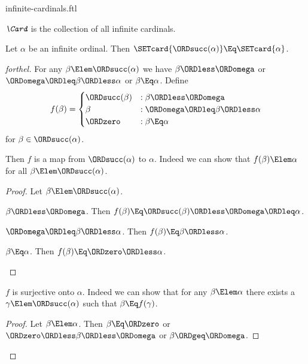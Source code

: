 \documentclass{stex}
\begin{document}
\begin{smodule}{infinite-cardinals.ftl}

\begin{definition}[forthel]
  $\emph{\Card}$ is the collection of all infinite cardinals.
\end{definition}

\begin{proposition}[forthel]
  Let $\alpha$ be an infinite ordinal.
  Then $\SETcard{\ORDsucc(\alpha)} \Eq \SETcard{\alpha}$.
\end{proposition}
\begin{proof}[forthel]
  For any $\beta \Elem \ORDsucc(\alpha)$ we have
  $\beta \ORDless \ORDomega$ or $\ORDomega \ORDleq \beta \ORDless \alpha$ or $\beta \Eq \alpha$.
  Define \[ f(\beta) =
    \begin{cases}
      \ORDsucc(\beta)  & : \beta \ORDless \ORDomega
      \\
      \beta         & : \ORDomega \ORDleq \beta \ORDless \alpha
      \\
      \ORDzero             & : \beta \Eq \alpha
    \end{cases} \]
  for $\beta \in \ORDsucc(\alpha)$.

  Then $f$ is a map from $\ORDsucc(\alpha)$ to $\alpha$.
  Indeed we can show that $f(\beta) \Elem \alpha$ for all
  $\beta \Elem \ORDsucc(\alpha)$.
  \begin{proof}
    Let $\beta \Elem \ORDsucc(\alpha)$.

    \begin{case}{$\beta \ORDless \ORDomega$.}
      Then $f(\beta)
        \Eq \ORDsucc(\beta)
        \ORDless \ORDomega
        \ORDleq \alpha$.
    \end{case}

    \begin{case}{$\ORDomega \ORDleq \beta \ORDless \alpha$.}
      Then $f(\beta)
        \Eq \beta
        \ORDless \alpha$.
    \end{case}

    \begin{case}{$\beta \Eq \alpha$.}
      Then $f(\beta)
        \Eq \ORDzero
        \ORDless \alpha$.
    \end{case}
  \end{proof}

  $f$ is surjective onto $\alpha$.
  Indeed we can show that for any $\beta \Elem \alpha$ there exists a
  $\gamma \Elem \ORDsucc(\alpha)$ such that $\beta \Eq f(\gamma)$.
  \begin{proof}
    Let $\beta \Elem \alpha$.
    Then $\beta \Eq \ORDzero$ or $\ORDzero \ORDless \beta \ORDless \ORDomega$ or $\beta \ORDgeq \ORDomega$.


\end{proof}
\end{proof}
\end{smodule}
\end{document}
